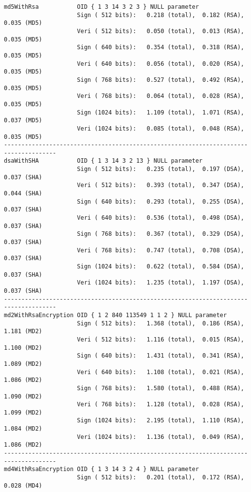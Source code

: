 {\begin{verbatim}
md5WithRsa           OID { 1 3 14 3 2 3 } NULL parameter
                     Sign ( 512 bits):   0.218 (total),  0.182 (RSA),  0.035 (MD5)  
                     Veri ( 512 bits):   0.050 (total),  0.013 (RSA),  0.035 (MD5)  
                     Sign ( 640 bits):   0.354 (total),  0.318 (RSA),  0.035 (MD5)  
                     Veri ( 640 bits):   0.056 (total),  0.020 (RSA),  0.035 (MD5)  
                     Sign ( 768 bits):   0.527 (total),  0.492 (RSA),  0.035 (MD5)  
                     Veri ( 768 bits):   0.064 (total),  0.028 (RSA),  0.035 (MD5)  
                     Sign (1024 bits):   1.109 (total),  1.071 (RSA),  0.037 (MD5)  
                     Veri (1024 bits):   0.085 (total),  0.048 (RSA),  0.035 (MD5)  
-------------------------------------------------------------------------------------
dsaWithSHA           OID { 1 3 14 3 2 13 } NULL parameter
                     Sign ( 512 bits):   0.235 (total),  0.197 (DSA),  0.037 (SHA)  
                     Veri ( 512 bits):   0.393 (total),  0.347 (DSA),  0.044 (SHA)  
                     Sign ( 640 bits):   0.293 (total),  0.255 (DSA),  0.037 (SHA)  
                     Veri ( 640 bits):   0.536 (total),  0.498 (DSA),  0.037 (SHA)  
                     Sign ( 768 bits):   0.367 (total),  0.329 (DSA),  0.037 (SHA)  
                     Veri ( 768 bits):   0.747 (total),  0.708 (DSA),  0.037 (SHA)  
                     Sign (1024 bits):   0.622 (total),  0.584 (DSA),  0.037 (SHA)  
                     Veri (1024 bits):   1.235 (total),  1.197 (DSA),  0.037 (SHA)  
-------------------------------------------------------------------------------------
md2WithRsaEncryption OID { 1 2 840 113549 1 1 2 } NULL parameter
                     Sign ( 512 bits):   1.368 (total),  0.186 (RSA),  1.181 (MD2)  
                     Veri ( 512 bits):   1.116 (total),  0.015 (RSA),  1.100 (MD2)  
                     Sign ( 640 bits):   1.431 (total),  0.341 (RSA),  1.089 (MD2)  
                     Veri ( 640 bits):   1.108 (total),  0.021 (RSA),  1.086 (MD2)  
                     Sign ( 768 bits):   1.580 (total),  0.488 (RSA),  1.090 (MD2)  
                     Veri ( 768 bits):   1.128 (total),  0.028 (RSA),  1.099 (MD2)  
                     Sign (1024 bits):   2.195 (total),  1.110 (RSA),  1.084 (MD2)  
                     Veri (1024 bits):   1.136 (total),  0.049 (RSA),  1.086 (MD2)  
-------------------------------------------------------------------------------------
md4WithRsaEncryption OID { 1 3 14 3 2 4 } NULL parameter
                     Sign ( 512 bits):   0.201 (total),  0.172 (RSA),  0.028 (MD4)  

\end{verbatim}}
